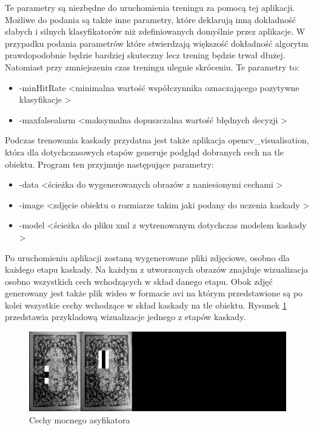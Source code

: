 Te parametry są niezbędne do uruchomienia treningu za pomocą tej aplikacji. Możliwe do podania są także inne parametry, które deklarują inną dokładność słabych i silnych klasyfikatorów niż zdefiniowanych domyślnie przez aplikacje. W przypadku podania parametrów które stwierdzają większość dokładność algorytm prawdopodobnie będzie bardziej skuteczny lecz trening będzie trwał dłużej. Natomiast przy zmniejszeniu czas treningu ulegnie skróceniu. Te parametry to:
 
\begin{itemize}
    \item -minHitRate \textless minimalna wartość współczynnika oznaczającego pozytywne klasyfikacje \textgreater
    \item -maxfalsealarm \textless maksymalna dopuszczalna wartość błędnych decyzji \textgreater

\end{itemize}

Podczas trenowania kaskady przydatna jest także aplikacja opencv\_visualisation, która dla dotychczasowych etapów generuje podgląd dobranych cech na tle obiektu. Program ten przyjmuje następujące parametry:

\begin{itemize}
    \item -data \textless ścieżka do wygenerowanych obrazów z naniesionymi cechami \textgreater
    \item -image \textless zdjęcie obiektu o rozmiarze takim jaki podany do uczenia kaskady \textgreater
    \item -model  \textless ścieżka do pliku xml z wytrenowanym dotychczas modelem kaskady \textgreater

\end{itemize}

Po uruchomieniu aplikacji zostaną wygenerowane pliki zdjęciowe, osobno dla każdego etapu kaskady. Na każdym z utworzonych obrazów znajduje wizualizacja osobno wszystkich cech wchodzących w skład danego etapu. Obok zdjęć generowany jest także plik wideo w formacie avi na którym przedstawione są po kolei wszystkie cechy wchodzące w skład kaskady na tle obiektu. Rysunek \ref{visExample} przedstawia przykladową wizualizacje jednego z etapów kaskady.

\begin{figure}[H]
\centering
\includegraphics[scale=0.1]{imgs/data3stage_1.png}
\caption{Cechy mocnego asyfikatora}\label{visExample}
\end{figure}

